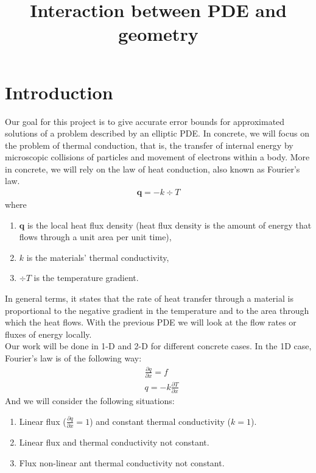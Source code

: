 \documentclass{article}
\title{Interaction between PDE and geometry}
\date{}
\begin{document}
    \maketitle
    \section*{\large{Introduction}}
    Our goal for this project is to give accurate error bounds for approximated solutions of a problem described by an elliptic PDE. In concrete, we will focus on the problem of thermal conduction, that is, the transfer of internal energy by microscopic collisions of particles and movement of electrons within a body. More in concrete, we will rely on the law of heat conduction, also known as Fourier's law.
    \begin{align*}
        \bm{q} = -k \div T
    \end{align*}
    where 
    \begin{enumerate}
        \item[] $\bm{q}$ is the local heat flux density (heat flux density is the amount of energy that flows through a unit area per unit time),
        \item[] $k$ is the materials' thermal conductivity,
        \item[] $\div{T}$ is the temperature gradient.
    \end{enumerate}
    In general terms, it states that the rate of heat transfer through a material is proportional to the negative gradient in the temperature and to the area through which the heat flows. With the previous PDE we will look at the flow rates or fluxes of energy locally. \\
    Our work will be done in 1-D and 2-D for different concrete cases. In the 1D case, Fourier's law is of the following way:
    \begin{align*}
        &\frac{\partial q}{\partial x} = f \\
        &q = -k \frac{\partial T}{\partial x} 
    \end{align*}
    And we will consider the following situations:
    \begin{enumerate}
        \item Linear flux ($\frac{\partial q}{\partial x} = 1$) and constant thermal conductivity ($k=1$).
        \item Linear flux and thermal conductivity not constant.
        \item Flux non-linear ant thermal conductivity not constant.
    \end{enumerate}
\end{document}
